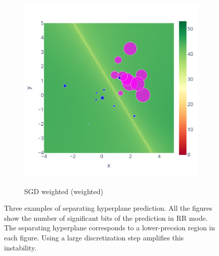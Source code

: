 \documentclass[11pt]{article}
\newcommand{\tristan}[1]{\color{orange}\textbf{From Tristan:} #1\color{black}\xspace}
\begin{document}
\begin{figure}
\begin{subfigure}{.3\linewidth}
    \label{fig:weighted_nw_sig}
    \end{subfigure}
    \begin{subfigure}{.3\linewidth}
    \caption{SGD weighted (weighted)}
    \includegraphics[width=\linewidth]{figure/Weighted/weighted.pdf}
    \label{fig:weighted_w_sig}
    \end{subfigure}
    \caption{
    Three examples of separating hyperplane prediction. All the figures show the number of significant bits of the prediction in RR mode. The separating hyperplane corresponds to a lower-precsion region in each figure. Using a large discretization step amplifies
    this instability.
    }
\label{fig:separating_hyperplan}
\end{figure}

\end{document}
